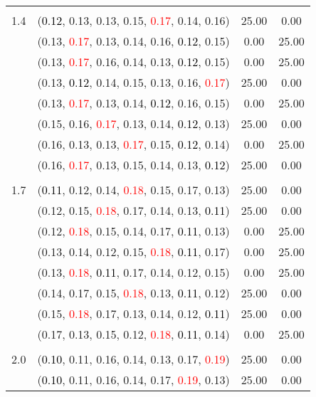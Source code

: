 \documentclass[10pt,a4paper]{report}
\begin{document}
\begin{center}
\begin{longtable}{clcc}
		&&&\\
		1.4			&(\textcolor{black}{0.12}, 0.13, 0.13, 0.15, \textcolor{red}{0.17}, 0.14, 0.16)&25.00&0.00\\
			&(0.13, \textcolor{red}{0.17}, 0.13, 0.14, 0.16, \textcolor{black}{0.12}, 0.15)&0.00&25.00\\
			&(0.13, \textcolor{red}{0.17}, 0.16, 0.14, 0.13, \textcolor{black}{0.12}, 0.15)&0.00&25.00\\
			&(0.13, \textcolor{black}{0.12}, 0.14, 0.15, 0.13, 0.16, \textcolor{red}{0.17})&25.00&0.00\\
			&(0.13, \textcolor{red}{0.17}, 0.13, 0.14, \textcolor{black}{0.12}, 0.16, 0.15)&0.00&25.00\\
			&(0.15, 0.16, \textcolor{red}{0.17}, 0.13, 0.14, \textcolor{black}{0.12}, 0.13)&25.00&0.00\\
			&(0.16, 0.13, 0.13, \textcolor{red}{0.17}, 0.15, \textcolor{black}{0.12}, 0.14)&0.00&25.00\\
			&(0.16, \textcolor{red}{0.17}, 0.13, 0.15, 0.14, 0.13, \textcolor{black}{0.12})&25.00&0.00\\
		&&&\\
		1.7			&(\textcolor{black}{0.11}, 0.12, 0.14, \textcolor{red}{0.18}, 0.15, 0.17, 0.13)&25.00&0.00\\
			&(0.12, 0.15, \textcolor{red}{0.18}, 0.17, 0.14, 0.13, \textcolor{black}{0.11})&25.00&0.00\\
			&(0.12, \textcolor{red}{0.18}, 0.15, 0.14, 0.17, \textcolor{black}{0.11}, 0.13)&0.00&25.00\\
			&(0.13, 0.14, 0.12, 0.15, \textcolor{red}{0.18}, \textcolor{black}{0.11}, 0.17)&0.00&25.00\\
			&(0.13, \textcolor{red}{0.18}, \textcolor{black}{0.11}, 0.17, 0.14, 0.12, 0.15)&0.00&25.00\\
			&(0.14, 0.17, 0.15, \textcolor{red}{0.18}, 0.13, \textcolor{black}{0.11}, 0.12)&25.00&0.00\\
			&(0.15, \textcolor{red}{0.18}, 0.17, 0.13, 0.14, 0.12, \textcolor{black}{0.11})&25.00&0.00\\
			&(0.17, 0.13, 0.15, 0.12, \textcolor{red}{0.18}, \textcolor{black}{0.11}, 0.14)&0.00&25.00\\
		&&&\\
		2.0			&(\textcolor{black}{0.10}, 0.11, 0.16, 0.14, 0.13, 0.17, \textcolor{red}{0.19})&25.00&0.00\\
			&(\textcolor{black}{0.10}, 0.11, 0.16, 0.14, 0.17, \textcolor{red}{0.19}, 0.13)&25.00&0.00\\

\end{longtable}
\end{center}
\end{document}
